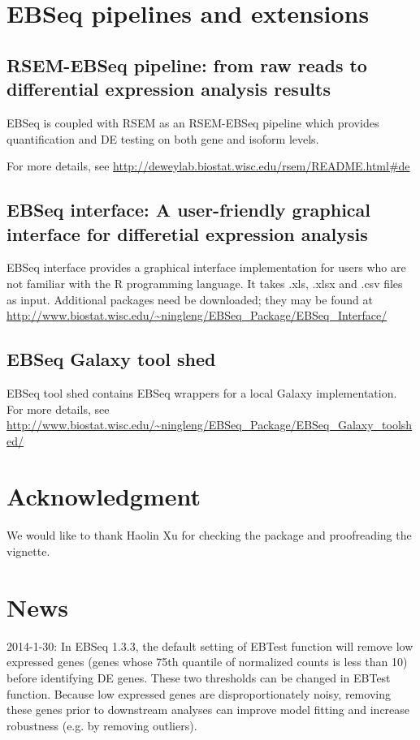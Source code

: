 \documentclass{article}
\begin{document}
\section{EBSeq pipelines and extensions}
\subsection{RSEM-EBSeq pipeline: from raw reads to differential expression analysis results}
EBSeq is coupled with RSEM \cite{Li11b} as an RSEM-EBSeq pipeline which provides 
quantification and DE testing on both gene and isoform levels.

For more details, see 
\url{http://deweylab.biostat.wisc.edu/rsem/README.html#de}

\subsection{EBSeq interface: A user-friendly graphical interface for differetial expression analysis}
EBSeq interface provides a graphical interface implementation for users who are not familiar with the R 
programming language. It takes .xls, .xlsx and .csv files as input. 
Additional packages need be downloaded; they may be found at
\url{http://www.biostat.wisc.edu/~ningleng/EBSeq_Package/EBSeq_Interface/}

\subsection{EBSeq Galaxy tool shed}
EBSeq tool shed contains EBSeq wrappers for a local Galaxy implementation.
For more details, see
\url{http://www.biostat.wisc.edu/~ningleng/EBSeq_Package/EBSeq_Galaxy_toolshed/}

\section{Acknowledgment}
We would like to thank Haolin Xu for checking the package and
proofreading the vignette.

\section{News}
2014-1-30: In EBSeq 1.3.3, the default setting of EBTest function will remove
low expressed genes (genes whose 75th quantile of normalized counts is less
than 10) before identifying DE genes.
These two thresholds can be changed in EBTest function.
Because low expressed genes are disproportionately noisy, 
removing these genes prior to downstream analyses can improve model fitting and increase robustness
(e.g. by removing outliers).
\end{document}
